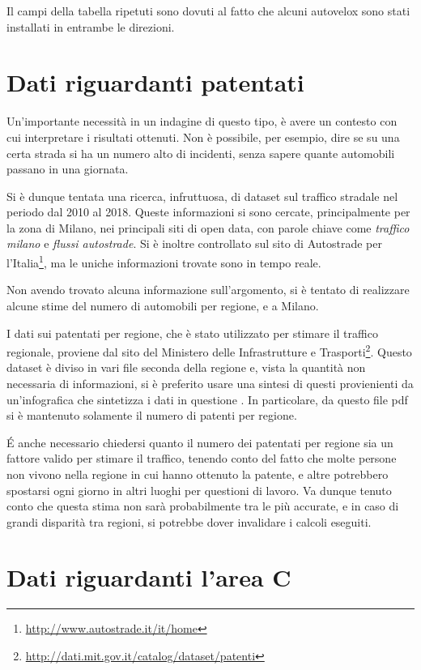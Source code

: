 \documentclass[a4paper,12pt]{report}
\newcommand{\quotestyle}[1]{\textit{#1}}
\begin{document}
Il campi della tabella ripetuti sono dovuti al fatto che alcuni autovelox sono stati 
installati in entrambe le direzioni.

\section{Dati riguardanti patentati}

Un'importante necessità in un indagine di questo tipo, è avere un contesto con cui 
interpretare i risultati ottenuti. 
Non è possibile, per esempio, dire se su una certa strada si ha un numero alto di 
incidenti, senza sapere quante automobili passano in una giornata.

Si è dunque tentata una ricerca, infruttuosa, di dataset sul traffico stradale nel periodo 
dal 2010 al 2018.
Queste informazioni si sono cercate, principalmente per la zona di Milano, nei principali 
siti di open data, con parole chiave come \quotestyle{traffico milano} e 
\quotestyle{flussi autostrade}. 
Si è inoltre controllato sul sito di Autostrade per 
l'Italia\footnote{\url{http://www.autostrade.it/it/home}}, 
ma le uniche informazioni trovate sono in tempo reale.

Non avendo trovato alcuna informazione sull'argomento, si è tentato di realizzare 
alcune stime del numero di automobili per regione, e a Milano.

I dati sui patentati per regione, che è stato utilizzato per stimare il traffico 
regionale, proviene dal sito del Ministero delle Infrastrutture e 
Trasporti\footnote{\url{http://dati.mit.gov.it/catalog/dataset/patenti}}.
Questo dataset è diviso in vari file seconda della regione e, vista la quantità 
non necessaria di informazioni, si è preferito usare una sintesi di questi provienienti da 
un'infografica che sintetizza i dati in questione \cite{INFOGRAFICA_MIT:1}.
In particolare, da questo file pdf si è mantenuto solamente il numero di patenti per regione.

\'E anche necessario chiedersi quanto il numero dei patentati per regione sia un fattore valido 
per stimare il traffico, tenendo conto del fatto che molte persone non vivono nella regione 
in cui hanno ottenuto la patente, e altre potrebbero spostarsi ogni giorno in altri 
luoghi per questioni di lavoro. 
Va dunque tenuto conto che questa stima non sarà probabilmente tra le più accurate, 
e in caso di grandi disparità tra regioni, si potrebbe dover invalidare i calcoli eseguiti.

\section{Dati riguardanti l'area C}
\end{document}
